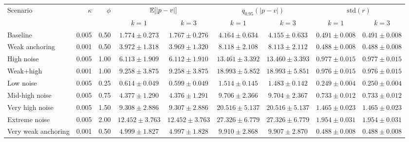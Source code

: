 \begin{tabular}{lrrcccccc}
\hline
Scenario & $\kappa$ & $\phi$ & \multicolumn{2}{c}{$\mathbb{E}[|p-v|]$} & \multicolumn{2}{c}{$q_{0.95}(|p-v|)$} & \multicolumn{2}{c}{$\mathrm{std}(r)$} \\
 &  &  & $k=1$ & $k=3$ & $k=1$ & $k=3$ & $k=1$ & $k=3$ \\
\hline
Baseline & 0.005 & 0.50 & $1.774\pm0.273$ & $1.767\pm0.276$ & $4.164\pm0.634$ & $4.155\pm0.633$ & $0.491\pm0.008$ & $0.491\pm0.008$ \\
Weak anchoring & 0.001 & 0.50 & $3.972\pm1.318$ & $3.969\pm1.320$ & $8.118\pm2.108$ & $8.113\pm2.112$ & $0.488\pm0.008$ & $0.488\pm0.008$ \\
High noise & 0.005 & 1.00 & $6.113\pm1.909$ & $6.112\pm1.910$ & $13.461\pm3.392$ & $13.460\pm3.393$ & $0.977\pm0.015$ & $0.977\pm0.015$ \\
Weak+high & 0.001 & 1.00 & $9.258\pm3.875$ & $9.258\pm3.875$ & $18.993\pm5.852$ & $18.993\pm5.851$ & $0.976\pm0.015$ & $0.976\pm0.015$ \\
Low noise & 0.005 & 0.25 & $0.614\pm0.049$ & $0.599\pm0.049$ & $1.514\pm0.145$ & $1.483\pm0.142$ & $0.249\pm0.004$ & $0.250\pm0.004$ \\
Mid-high noise & 0.005 & 0.75 & $4.377\pm1.290$ & $4.376\pm1.291$ & $9.706\pm2.366$ & $9.704\pm2.367$ & $0.733\pm0.012$ & $0.733\pm0.012$ \\
Very high noise & 0.005 & 1.50 & $9.308\pm2.886$ & $9.307\pm2.886$ & $20.516\pm5.137$ & $20.516\pm5.137$ & $1.465\pm0.023$ & $1.465\pm0.023$ \\
Extreme noise & 0.005 & 2.00 & $12.452\pm3.763$ & $12.452\pm3.763$ & $27.326\pm6.779$ & $27.326\pm6.779$ & $1.954\pm0.031$ & $1.954\pm0.031$ \\
Very weak anchoring & 0.001 & 0.50 & $4.999\pm1.827$ & $4.997\pm1.828$ & $9.910\pm2.868$ & $9.907\pm2.870$ & $0.488\pm0.008$ & $0.488\pm0.008$ \\
\hline
\end{tabular}
